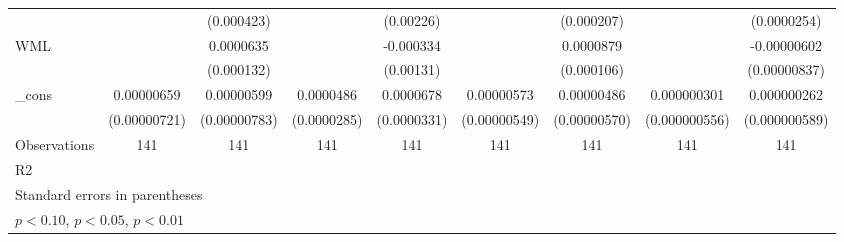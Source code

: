 \begin{table}[htbp]
\begin{tabular}{l*{8}{c}}
                    &                     &  (0.000423)         &                     &   (0.00226)         &                     &  (0.000207)         &                     & (0.0000254)         \\
WML                 &                     &   0.0000635         &                     &   -0.000334         &                     &   0.0000879         &                     & -0.00000602         \\
                    &                     &  (0.000132)         &                     &   (0.00131)         &                     &  (0.000106)         &                     &(0.00000837)         \\
\_cons              &  0.00000659         &  0.00000599         &   0.0000486\sym{*}  &   0.0000678\sym{**} &  0.00000573         &  0.00000486         & 0.000000301         & 0.000000262         \\
                    &(0.00000721)         &(0.00000783)         & (0.0000285)         & (0.0000331)         &(0.00000549)         &(0.00000570)         &(0.000000556)         &(0.000000589)         \\
\hline
Observations        &         141         &         141         &         141         &         141         &         141         &         141         &         141         &         141         \\
R2                  &                     &                     &                     &                     &                     &                     &                     &                     \\
\hline\hline
\multicolumn{9}{l}{\footnotesize Standard errors in parentheses}\\
\multicolumn{9}{l}{\footnotesize \sym{*} \(p<0.10\), \sym{**} \(p<0.05\), \sym{***} \(p<0.01\)}\\
\end{tabular}
\end{table}
